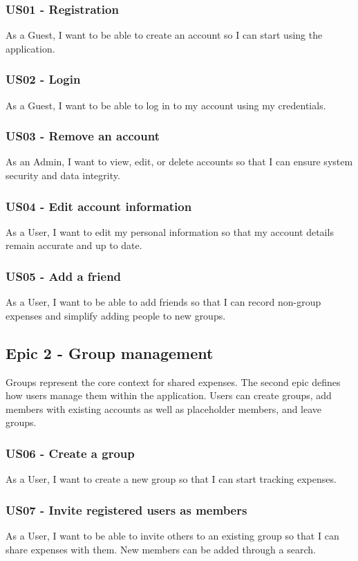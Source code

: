 \documentclass{ctuthesis}
\begin{document}
\subsubsection{US01 - Registration}
As a Guest, I want to be able to create an account so I can start using the application.

\subsubsection{US02 - Login}
As a Guest, I want to be able to log in to my account using my credentials.

\subsubsection{US03 - Remove an account}
As an Admin, I want to view, edit, or delete accounts so that I can ensure system security and data integrity.

\subsubsection{US04 - Edit account information}
As a User, I want to edit my personal information so that my account details remain accurate and up to date.

\subsubsection{US05 - Add a friend}
As a User, I want to be able to add friends so that I can record non-group expenses and simplify adding people to new groups.


\subsection{Epic 2 - Group management}
Groups represent the core context for shared expenses. The second epic defines how users manage them within the application. Users can create groups, add members with existing accounts as well as placeholder members, and leave groups.
\subsubsection{US06 - Create a group}
As a User, I want to create a new group so that I can start tracking expenses.

\subsubsection{US07 - Invite registered users as members}
As a User, I want to be able to invite others to an existing group so that I can share expenses with them. New members can be added through a search.
\end{document}
